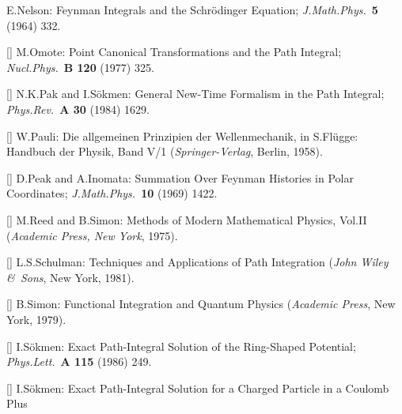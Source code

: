 E.Nelson:
Feynman Integrals and the Schr\"odinger Equation;
{\it J.Math.Phys.}\ {\bf 5} (1964) 332.
\item{[\OMO]}
M.Omote:
Point Canonical Transformations and the Path Integral;
{\it Nucl.Phys.}\ {\bf B 120} (1977) 325.
\item{[\PAKSc]}
N.K.Pak and I.S\"okmen:
General New-Time Formalism in the Path Integral;
{\it Phys.Rev.}\ {\bf A 30} (1984) 1629.
\item{[\PAUb]}
W.Pauli: Die allgemeinen Prinzipien der Wellenmechanik,
in S.Fl\"ugge: Handbuch der Physik, Band V/1
({\it Springer-Verlag}, Berlin, 1958).
\item{[\PI]}
D.Peak and A.Inomata:
Summation Over Feynman Histories in Polar Coordinates;
{\it J.Math.Phys.}\ {\bf 10} (1969) 1422.
\item{[\RS]}
M.Reed and B.Simon:
Methods of Modern Mathematical Physics, Vol.II
({\it Academic Press, New York}, 1975).
\item{[\SCHUc]}
L.S.Schulman:
Techniques and Applications of Path Integration
({\it John Wiley \&\ Sons}, New York, 1981).
\item{[\SIMON]}
B.Simon:
Functional Integration and Quantum Physics
({\it Academic Press}, New York, 1979).
\item{[\SOKb]}
I.S\"okmen:
Exact Path-Integral Solution of the Ring-Shaped Potential;
{\it Phys.Lett.}\ {\bf A 115} (1986) 249.
\item{[\SOKc]}
I.S\"okmen:
Exact Path-Integral Solution for a Charged Particle in a Coulomb Plus
